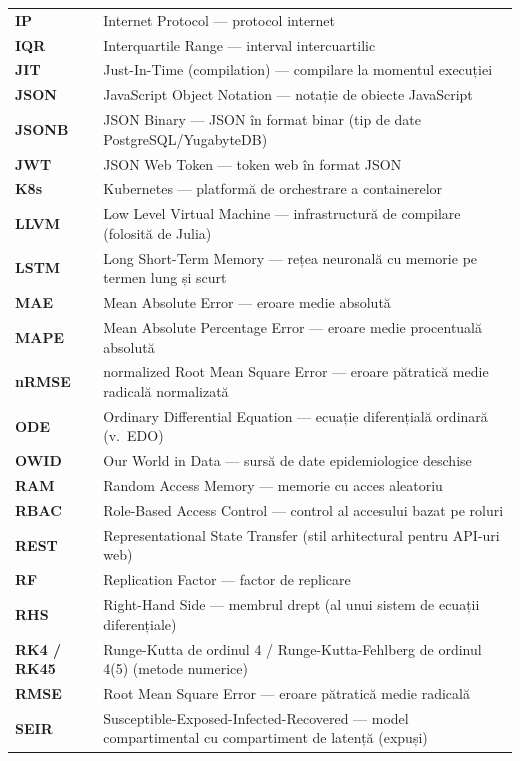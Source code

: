 \begin{longtable}{@{}>{\bfseries}l@{\hspace{1cm}}p{11.3cm}@{}}
IP         & Internet Protocol --- protocol internet \\
IQR        & Interquartile Range --- interval intercuartilic \\
JIT        & Just-In-Time (compilation) --- compilare la momentul execuției \\
JSON       & JavaScript Object Notation --- notație de obiecte JavaScript \\
JSONB      & JSON Binary --- JSON în format binar (tip de date PostgreSQL/YugabyteDB) \\
JWT        & JSON Web Token --- token web în format JSON \\
K8s        & Kubernetes --- platformă de orchestrare a containerelor \\
LLVM       & Low Level Virtual Machine --- infrastructură de compilare (folosită de Julia) \\
LSTM       & Long Short-Term Memory --- rețea neuronală cu memorie pe termen lung și scurt \\
MAE        & Mean Absolute Error --- eroare medie absolută \\
MAPE       & Mean Absolute Percentage Error --- eroare medie procentuală absolută \\
nRMSE      & normalized Root Mean Square Error --- eroare pătratică medie radicală normalizată \\
ODE        & Ordinary Differential Equation --- ecuație diferențială ordinară (v.\ EDO) \\
OWID       & Our World in Data --- sursă de date epidemiologice deschise \\
RAM        & Random Access Memory --- memorie cu acces aleatoriu \\
RBAC       & Role-Based Access Control --- control al accesului bazat pe roluri \\
REST       & Representational State Transfer (stil arhitectural pentru API-uri web) \\
RF         & Replication Factor --- factor de replicare \\
RHS        & Right-Hand Side --- membrul drept (al unui sistem de ecuații diferențiale) \\
RK4 / RK45 & Runge-Kutta de ordinul 4 / Runge-Kutta-Fehlberg de ordinul 4(5) (metode numerice) \\
RMSE       & Root Mean Square Error --- eroare pătratică medie radicală \\
SEIR       & Susceptible-Exposed-Infected-Recovered --- model compartimental cu compartiment de latență (expuși) \\

\end{longtable}
